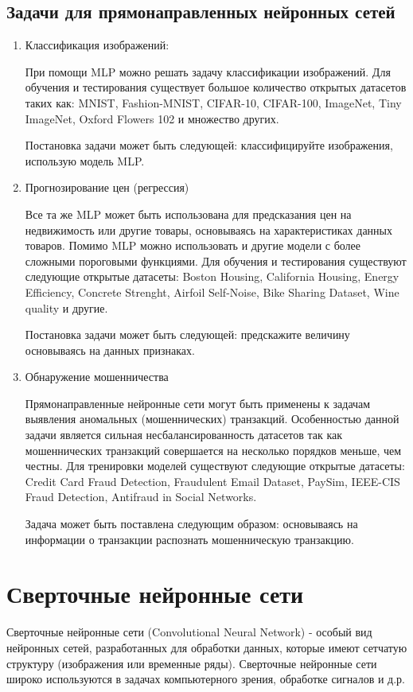 {\subsection{Задачи для прямонаправленных нейронных сетей}
\begin{enumerate}
    \item Классификация изображений:

          При помощи MLP можно решать задачу классификации изображений. Для обучения и тестирования
          существует большое количество открытых датасетов таких как: MNIST, Fashion-MNIST, CIFAR-10,
          CIFAR-100, ImageNet, Tiny ImageNet, Oxford Flowers 102 и множество других.

          Постановка задачи может быть следующей: классифицируйте изображения, использую модель MLP.

    \item Прогнозирование цен (регрессия)

          Все та же MLP может быть использована для предсказания цен на недвижимость или другие товары,
          основываясь на характеристиках данных товаров. Помимо MLP можно использовать и другие модели с
          более сложными пороговыми функциями. Для обучения и тестирования существуют следующие открытые
          датасеты: Boston Housing, California Housing, Energy Efficiency, Concrete Strenght, Airfoil
          Self-Noise, Bike Sharing Dataset, Wine quality и другие.

          Постановка задачи может быть следующей: предскажите величину основываясь на данных признаках.

    \item Обнаружение мошенничества

          Прямонаправленные нейронные сети могут быть применены к задачам выявления аномальных
          (мошеннических) транзакций. Особенностью данной задачи является сильная несбалансированность
          датасетов так как мошеннических транзакций совершается на несколько порядков меньше, чем
          честны. Для тренировки моделей существуют следующие открытые датасеты: Credit Card Fraud
          Detection, Fraudulent Email Dataset, PaySim, IEEE-CIS Fraud Detection, Antifraud in Social
          Networks.

          Задача может быть поставлена следующим образом: основываясь на информации о транзакции распознать
          мошенническую транзакцию.
\end{enumerate}


\section{Сверточные нейронные сети}
Сверточные нейронные сети (Convolutional Neural Network) - особый вид нейронных сетей, разработанных
для обработки данных, которые имеют сетчатую структуру (изображения или временные ряды). Сверточные
нейронные сети широко используются в задачах компьютерного зрения, обработке сигналов и д.р.

}

